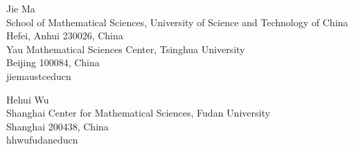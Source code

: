 \documentclass{aic}
\begin{document}
\begin{aicauthors}
\begin{authorinfo}[jie]
  Jie Ma\\
  School of Mathematical Sciences, University of Science and Technology of China\\
  Hefei, Anhui 230026, China\\
  Yau Mathematical Sciences Center, Tsinghua University\\
  Beijing 100084, China\\
  jiema\imageat{}ustc\imagedot{}edu\imagedot{}cn
\end{authorinfo}
\begin{authorinfo}[hehui]
  Hehui Wu\\
  Shanghai Center for Mathematical Sciences, Fudan University\\
  Shanghai 200438, China\\
  hhwu\imageat{}fudan\imagedot{}edu\imagedot{}cn
\end{authorinfo}
\end{aicauthors}
\end{document}
